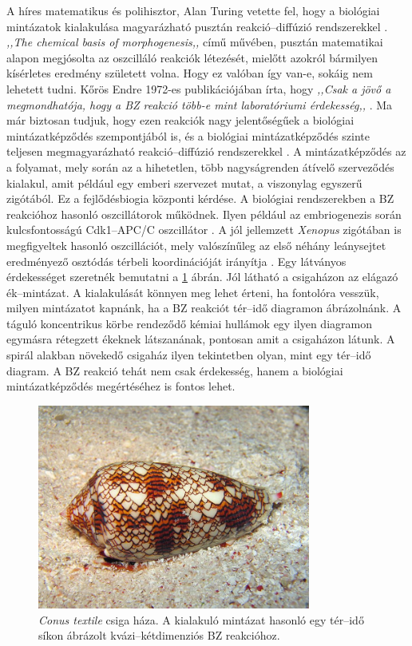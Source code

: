 A híres matematikus és polihisztor, Alan Turing vetette fel, hogy a biológiai mintázatok kialakulása magyarázható pusztán reakció--diffúzió rendszerekkel \cite{turing1952chemical}. \emph{,,The chemical basis of morphogenesis,,} című művében, pusztán matematikai alapon megjósolta az oszcilláló reakciók létezését, mielőtt azokról bármilyen kísérletes eredmény született volna. Hogy ez valóban így van-e, sokáig nem lehetett tudni. Kőrös Endre 1972-es publikációjában írta, hogy \emph{,,Csak a jövő a megmondhatója, hogy a BZ reakció több-e mint laboratóriumi érdekesség,,} \cite{field1972oscillations}. Ma már biztosan tudjuk, hogy ezen reakciók nagy jelentőségűek a biológiai mintázatképződés szempontjából is, és a biológiai mintázatképződés szinte teljesen megmagyarázható reakció--diffúzió rendszerekkel \cite{kondo2010reaction}. A mintázatképződés az a folyamat, mely során az a hihetetlen, több nagyságrenden átívelő szerveződés kialakul, amit például egy emberi szervezet mutat, a viszonylag egyszerű zigótából. Ez a fejlődésbiogia központi kérdése. A biológiai rendszerekben a BZ reakcióhoz hasonló oszcillátorok működnek. Ilyen például az embriogenezis során kulcsfontosságú Cdk1--APC/C oszcillátor \cite{yang2013cdk1}. A jól jellemzett \emph{Xenopus} zigótában is megfigyeltek hasonló oszcillációt, mely valószínűleg az első néhány leánysejtet eredményező osztódás térbeli koordinációját irányítja \cite{chang2013mitotic}. Egy látványos érdekességet szeretnék bemutatni a \ref{fig:csiga} ábrán. Jól látható a csigaházon az elágazó ék--mintázat. A kialakulását könnyen meg lehet érteni, ha fontolóra vesszük, milyen mintázatot kapnánk, ha a BZ reakciót tér--idő diagramon ábrázolnánk. A táguló koncentrikus körbe rendeződő kémiai hullámok egy ilyen diagramon egymásra rétegzett ékeknek látszanának, pontosan amit a csigaházon látunk. A spirál alakban növekedő csigaház ilyen tekintetben olyan, mint egy tér--idő diagram. A BZ reakció tehát nem csak érdekesség, hanem a biológiai mintázatképződés megértéséhez is fontos lehet.

\begin{figure}[h]
\centering
\includegraphics[width=0.8\textwidth]{img/conus.jpg}
\caption{\emph{Conus textile} csiga háza. A kialakuló mintázat hasonló egy tér--idő síkon ábrázolt kvázi--kétdimenziós BZ reakcióhoz.}
\label{fig:csiga}
\end{figure}

